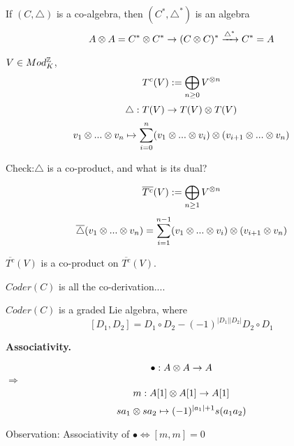 \begin{rem}
If $(C,\triangle)$ is a co-algebra, then
$(C^*,\triangle^*)$ is an algebra
$$A\otimes A=C^*\otimes C^*\to(C\otimes C)^*\xrightarrow{\triangle^*}C^*=A$$
\end{rem}

\begin{example}
$V\in Mod_K^{\mathbb{Z}}$,
$$T^c(V):=\bigoplus_{n\geq 0}V^{\otimes n}$$
$$\triangle:T(V)\to T(V)\otimes T(V)$$
$$v_1\otimes...\otimes v_n\mapsto
\sum_{i=0}^n(v_1\otimes...\otimes v_i)\otimes(v_{i+1}\otimes...\otimes v_n)$$
\end{example}

Check:$\triangle$ is a co-product, and what is its dual?

\begin{example}
$$\overline{T^c}(V):=\bigoplus_{n\geq 1}V^{\otimes n}$$
$$\overline{\triangle}(v_1\otimes...\otimes v_n)
=
\sum_{i=1}^{n-1}(v_1\otimes...\otimes v_i)\otimes(v_{i+1}\otimes v_n)$$

$\overline{T^c}(V)$ is a co-product on $\overline{T^c}(V)$.
\end{example}

$Coder(C)$ is all the co-derivation....

\begin{prop}
$Coder(C)$ is a graded Lie algebra, where
$$[D_1,D_2]=D_1\circ D_2-(-1)^{|D_1||D_2|}D_2\circ D_1$$
\end{prop}

\textbf{Associativity.}

$$\bullet:A\otimes A\to A$$
$\Longrightarrow$
$$m:A[1]\otimes A[1]\to A[1]$$
$$sa_1\otimes sa_2\mapsto(-1)^{|a_1|+1}s(a_1a_2)$$

Observation:
Associativity of $\bullet\Longleftrightarrow[m,m]=0$








